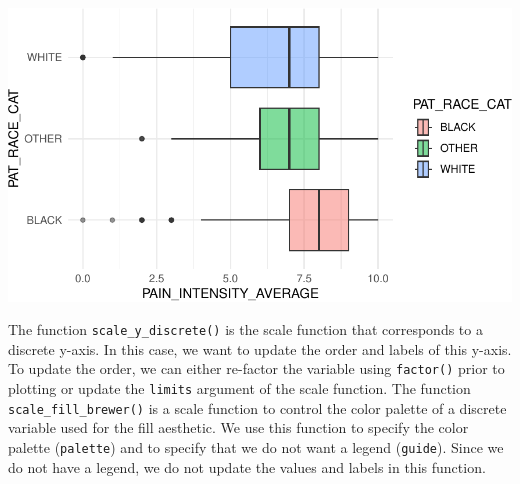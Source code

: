 \documentclass[
  letterpaper,
]{latex/krantz}
\begin{document}
\begin{center}
\includegraphics[width=1\textwidth,height=\textheight]{book/visualization_ggplot_files/figure-pdf/unnamed-chunk-12-1.pdf}
\end{center}

The function
\texttt{scale\_y\_discrete()}
is the scale function that corresponds to a discrete y-axis. In this
case, we want to update the order and labels of this y-axis. To update
the order, we can either re-factor the variable using \texttt{factor()}
prior to plotting or update the \texttt{limits} argument of the scale
function. The function
\texttt{scale\_fill\_brewer()}
is a scale function to control the color palette of a discrete variable
used for the fill aesthetic. We use this function to specify the color
palette (\texttt{palette}) and to specify that we do not want a legend
(\texttt{guide}). Since we do not have a legend, we do not update the
values and labels in this function.
\end{document}
